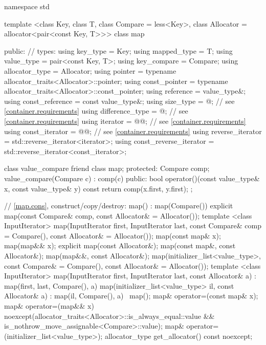 \begin{codeblock}
namespace std {
  template <class Key, class T, class Compare = less<Key>,
            class Allocator = allocator<pair<const Key, T>>>
  class map {
  public:
    // types:
    using key_type               = Key;
    using mapped_type            = T;
    using value_type             = pair<const Key, T>;
    using key_compare            = Compare;
    using allocator_type         = Allocator;
    using pointer                = typename allocator_traits<Allocator>::pointer;
    using const_pointer          = typename allocator_traits<Allocator>::const_pointer;
    using reference              = value_type&;
    using const_reference        = const value_type&;
    using size_type              = @\impdef@; // see \ref{container.requirements}
    using difference_type        = @\impdef@; // see \ref{container.requirements}
    using iterator               = @@; // see \ref{container.requirements}
    using const_iterator         = @@; // see \ref{container.requirements}
    using reverse_iterator       = std::reverse_iterator<iterator>;
    using const_reverse_iterator = std::reverse_iterator<const_iterator>;

    class value_compare {
      friend class map;
    protected:
      Compare comp;
      value_compare(Compare c) : comp(c) {}
    public:
      bool operator()(const value_type& x, const value_type& y) const {
        return comp(x.first, y.first);
      }
    };

    // \ref{map.cons}, construct/copy/destroy:
    map() : map(Compare()) { }
    explicit map(const Compare& comp, const Allocator& = Allocator());
    template <class InputIterator>
      map(InputIterator first, InputIterator last,
          const Compare& comp = Compare(), const Allocator& = Allocator());
    map(const map& x);
    map(map&& x);
    explicit map(const Allocator&);
    map(const map&, const Allocator&);
    map(map&&, const Allocator&);
    map(initializer_list<value_type>,
      const Compare& = Compare(),
      const Allocator& = Allocator());
    template <class InputIterator>
      map(InputIterator first, InputIterator last, const Allocator& a)
        : map(first, last, Compare(), a) { }
    map(initializer_list<value_type> il, const Allocator& a)
      : map(il, Compare(), a) { }
    ~map();
    map& operator=(const map& x);
    map& operator=(map&& x)
      noexcept(allocator_traits<Allocator>::is_always_equal::value &&
               is_nothrow_move_assignable<Compare>::value);
    map& operator=(initializer_list<value_type>);
    allocator_type get_allocator() const noexcept;

}}
\end{codeblock}
